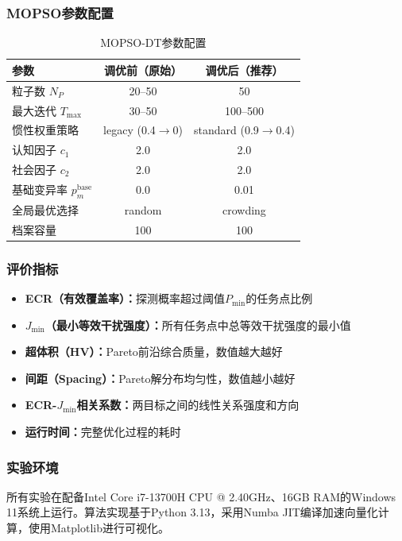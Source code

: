 \subsubsection{MOPSO参数配置}

\begin{table}[t]
\centering
\caption{MOPSO-DT参数配置}
\label{tab:mopso_params}
\begin{tabular}{lcc}
\toprule
参数 & 调优前（原始） & 调优后（推荐） \\
\midrule
粒子数 $N_P$ & 20--50 & 50 \\
最大迭代 $T_{\max}$ & 30--50 & 100--500 \\
惯性权重策略 & legacy (0.4$\to$0) & standard (0.9$\to$0.4) \\
认知因子 $c_1$ & 2.0 & 2.0 \\
社会因子 $c_2$ & 2.0 & 2.0 \\
基础变异率 $p_m^{\text{base}}$ & 0.0 & 0.01 \\
全局最优选择 & random & crowding \\
档案容量 & 100 & 100 \\
\bottomrule
\end{tabular}
\end{table}

\subsubsection{评价指标}

\begin{itemize}
    \item \textbf{ECR（有效覆盖率）：}探测概率超过阈值$P_{\min}$的任务点比例
    \item \textbf{$J_{\min}$（最小等效干扰强度）：}所有任务点中总等效干扰强度的最小值
    \item \textbf{超体积（HV）：}Pareto前沿综合质量，数值越大越好
    \item \textbf{间距（Spacing）：}Pareto解分布均匀性，数值越小越好
    \item \textbf{ECR-$J_{\min}$相关系数：}两目标之间的线性关系强度和方向
    \item \textbf{运行时间：}完整优化过程的耗时
\end{itemize}

\subsubsection{实验环境}

所有实验在配备Intel Core i7-13700H CPU @ 2.40GHz、16GB RAM的Windows 11系统上运行。算法实现基于Python 3.13，采用Numba JIT编译加速向量化计算，使用Matplotlib进行可视化。

